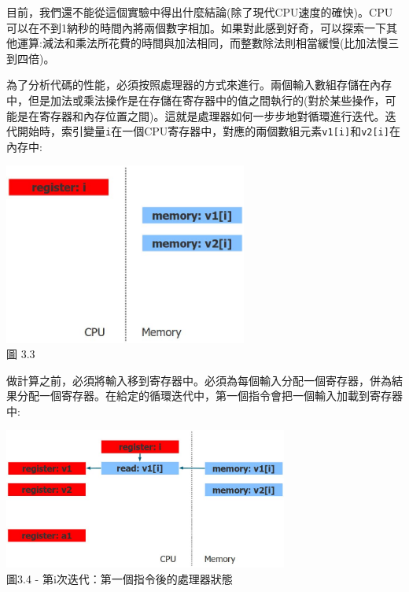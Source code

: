 目前，我們還不能從這個實驗中得出什麼結論(除了現代CPU速度的確快)。CPU可以在不到1納秒的時間內將兩個數字相加。如果對此感到好奇，可以探索一下其他運算:減法和乘法所花費的時間與加法相同，而整數除法則相當緩慢(比加法慢三到四倍)。

為了分析代碼的性能，必須按照處理器的方式來進行。兩個輸入數組存儲在內存中，但是加法或乘法操作是在存儲在寄存器中的值之間執行的(對於某些操作，可能是在寄存器和內存位置之間)。這就是處理器如何一步步地對循環進行迭代。迭代開始時，索引變量\texttt{i}在一個CPU寄存器中，對應的兩個數組元素\texttt{v1[i]}和\texttt{v2[i]}在內存中:

\begin{center}
\includegraphics[width=0.6\textwidth]{content/1/chapter3/images/3.jpg}\\
圖 3.3
\end{center}

做計算之前，必須將輸入移到寄存器中。必須為每個輸入分配一個寄存器，併為結果分配一個寄存器。在給定的循環迭代中，第一個指令會把一個輸入加載到寄存器中:

\begin{center}
\includegraphics[width=0.7\textwidth]{content/1/chapter3/images/4.jpg}\\
圖3.4 - 第i次迭代：第一個指令後的處理器狀態
\end{center}

